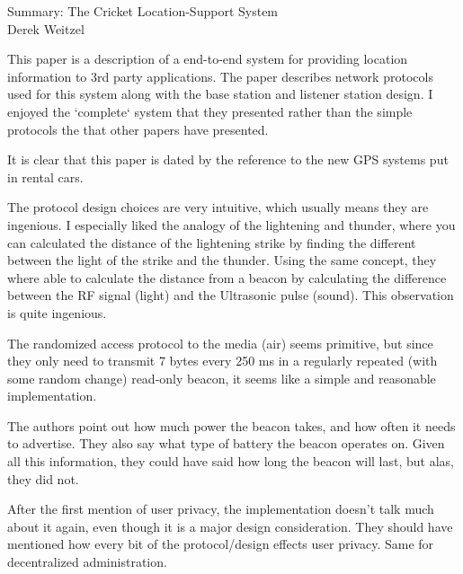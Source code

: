 \documentclass[12pt]{article}
\begin{document}
\begin{center}
{\huge Summary: The Cricket Location-Support System } \\
Derek Weitzel
\end{center}

This paper is a description of a end-to-end system for providing location information to 3rd party applications.  The paper describes network protocols used for this system along with the base station and listener station design.  I enjoyed the `complete` system that they presented rather than the simple protocols the that other papers have presented.

It is clear that this paper is dated by the reference to the new GPS systems put in rental cars.

The protocol design choices are very intuitive, which usually means they are ingenious.  I especially liked the analogy of the lightening and thunder, where you can calculated the distance of the lightening strike by finding the different between the light of the strike and the thunder.  Using the same concept, they where able to calculate the distance from a beacon by calculating the difference between the RF signal (light) and the Ultrasonic pulse (sound).  This observation is quite ingenious.

The randomized access protocol to the media (air) seems primitive, but since they only need to transmit 7 bytes every 250 ms in a regularly repeated (with some random change) read-only beacon, it seems like a simple and reasonable implementation.

The authors point out how much power the beacon takes, and how often it needs to advertise.  They also say what type of battery the beacon operates on.  Given all this information, they could have said how long the beacon will last, but alas, they did not.

After the first mention of user privacy, the implementation doesn't talk much about it again, even though it is a major design consideration.  They should have mentioned how every bit of the protocol/design effects user privacy.  Same for decentralized administration.  
\end{document}
